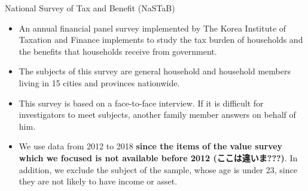 \documentclass[
  ignorenonframetext,
  aspectratio=169]{beamer}
\providecommand{\tightlist}{%
  \setlength{\itemsep}{0pt}\setlength{\parskip}{0pt}}
\begin{document}
\begin{frame}{National Survey of Tax and Benefit (NaSTaB)}
\protect\hypertarget{national-survey-of-tax-and-benefit-nastab}{}
\begin{itemize}
\tightlist
\item
  An annual financial panel survey implemented by The Korea Institute of Taxation and Finance implements to study the tax burden of households and the benefits that households receive from government.
\item
  The subjects of this survey are general household and household members living in 15 cities and provinces nationwide.
\item
  This survey is based on a face-to-face interview. If it is difficult for investigators to meet subjects, another family member answers on behalf of him.
\item
  We use data from 2012 to 2018 \textbf{since the items of the value survey which we focused is not available before 2012 (ここは違いま???)}. In addition, we exclude the subject of the sample, whose age is under 23, since they are not likely to have income or asset.
\end{itemize}
\end{frame}
\end{document}
